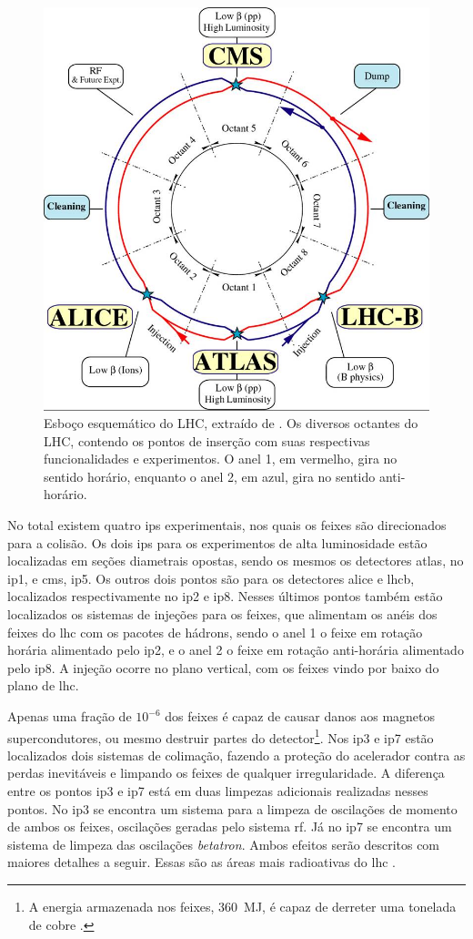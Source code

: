 \begin{figure}[h!t]
\centering
\includegraphics[width=.6\textwidth]{imagens/lhc-schematic.png}
\caption[Esboço esquemático do LHC]{Esboço esquemático do LHC, extraído de
\cite{webLHC}. Os diversos octantes do LHC, contendo os pontos de inserção 
com suas respectivas funcionalidades e experimentos.
O anel 1, em vermelho, gira no sentido horário, enquanto o anel
2, em azul, gira no sentido anti-horário.}
\label{fig:esquema_lhc}
\end{figure}

No total existem quatro \glspl{ip} experimentais, nos quais os feixes são
direcionados para a colisão. Os dois \glspl{ip} para
os experimentos de alta luminosidade estão localizadas em seções diametrais
opostas, sendo os mesmos os detectores \acrshort{atlas}, no \gls{ip}1, e
\acrshort{cms}, \gls{ip}5. 
Os outros dois pontos são para os detectores \acrshort{alice} e
\acrshort{lhcb}, localizados respectivamente no \gls{ip}2 e \gls{ip}8. Nesses últimos
pontos também estão localizados os sistemas de injeções para os feixes, que
alimentam os anéis dos feixes do \gls{lhc} 
com os pacotes de hádrons, sendo o anel 1 o feixe em rotação horária alimentado
pelo \gls{ip}2, e o anel 2 o 
feixe em rotação anti-horária alimentado pelo \gls{ip}8. 
A injeção ocorre no plano vertical, com os feixes
vindo por baixo do plano de \gls{lhc}. 

Apenas uma fração de $10^{-6}$ dos feixes é capaz de causar
danos aos magnetos supercondutores, ou mesmo destruir partes do detector\footnote{A 
energia armazenada nos feixes, 360~MJ, é capaz de derreter uma tonelada 
de cobre \cite{closerLook,lhc_design}.}. Nos \gls{ip}3 e \gls{ip}7 estão localizados 
dois sistemas de colimação, fazendo a proteção 
do acelerador contra as perdas inevitáveis e limpando os feixes de
qualquer irregularidade. A diferença entre os pontos \gls{ip}3 e \gls{ip}7 está
em duas limpezas adicionais realizadas nesses pontos. No \gls{ip}3 se
encontra um sistema para a limpeza de oscilações de momento de ambos os feixes,
oscilações geradas pelo sistema \acrshort{rf}. Já no \gls{ip}7 se encontra um sistema de
limpeza das oscilações \emph{betatron}. Ambos efeitos serão descritos com
maiores detalhes a seguir. Essas são as áreas mais radioativas do \gls{lhc} 
\cite{lhc_design}.

